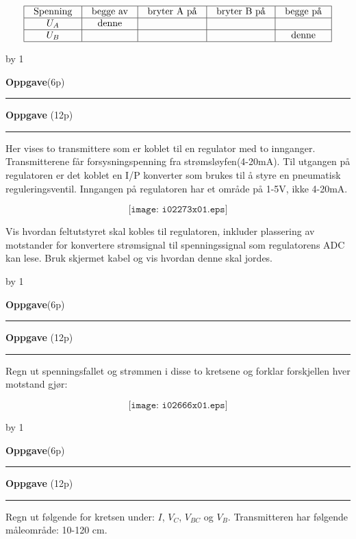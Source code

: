 \documentclass[12pt,a4paper]{article}
\def\oppgave{
            \advance\questnum by 1
	    \ifthenelse{\questnum>0\AND \questnum<9}
	    {
                \vskip 1cm
		\textbf{Oppgave}\hskip 5pt\the\questnum \hfill \hfill(6p)
		\vskip 3pt
		\hrule
	\vskip 0.5cm}
	{
                \vskip 1cm
		\textbf{Oppgave}\hskip 5pt \the\questnum \hfill \hfill(12p)
		\vskip 3pt \hrule \vskip 0.5cm }

		}
\begin{document}

$$\vbox{\offinterlineskip
\halign{\strut
\vrule \quad\hfil # \ \hfil & 
\vrule \quad\hfil # \ \hfil & 
\vrule \quad\hfil # \ \hfil & 
\vrule \quad\hfil # \ \hfil & 
\vrule \quad\hfil # \ \hfil \vrule \cr
\noalign{\hrule}
%
Spenning & begge av & bryter A på & bryter B på & begge på \cr
%
\noalign{\hrule}
%
$U_A$ & denne  &  &  &  \cr
%
\noalign{\hrule}
%
$U_B$ &  &  &  & denne  \cr
%
\noalign{\hrule}
} %
}$$ %

\vskip 2.5pt 

\vskip 2.5pt 

\vskip 2.5pt 
\newpage
\oppgave{}%
\vskip 2.5pt 
Her vises to transmittere som er koblet til en regulator med to innganger. Transmitterene får forsysningspenning fra strømsløyfen(4-20mA). Til utgangen på regulatoren er det koblet en I/P konverter som brukes til å styre en pneumatisk reguleringsventil. Inngangen på regulatoren har et område på 1-5V, ikke 4-20mA. 

$$\texttt{[image: i02273x01.eps]}$$

Vis hvordan feltutstyret skal kobles til regulatoren, inkluder plassering av motstander for konvertere strømsignal til spenningssignal som regulatorens ADC kan lese. Bruk skjermet kabel og vis hvordan denne skal jordes. 



\vskip 2.5pt 

\vskip 2.5pt 
\newpage
\oppgave{}%
\vskip 2.5pt 
Regn ut spenningsfallet og strømmen i disse to kretsene og forklar forskjellen hver motstand gjør:

$$\texttt{[image: i02666x01.eps]}$$


\vskip 2.5pt 
\newpage
\oppgave{}%
\vskip 2.5pt 
Regn ut følgende for kretsen under: $I$, $V_{C}$, $V_{BC}$ og $V_{B}$. Transmitteren har følgende måleområde: 10-120 cm.  
\end{document}
